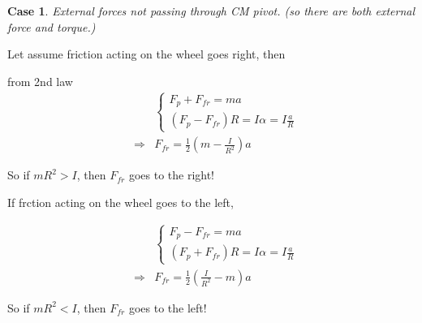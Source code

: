 \documentclass{article}
\newtheorem{case}[theorem]{Case}
\begin{document}
\newpage

\begin{case}
External forces not passing through CM pivot. (so there are both external
force and torque.)
\end{case}



\bigskip

\begin{multicols}{2}%

Let assume friction acting on the wheel goes right, then



from 2nd law%
\begin{eqnarray*}
&&\left\{ 
\begin{array}{c}
F_{p}+F_{fr}=ma \\ 
\left( F_{p}-F_{fr}\right) R=I\alpha =I\frac{a}{R}%
\end{array}%
\right. \\
&\Rightarrow &F_{fr}=\frac{1}{2}\left( m-\frac{I}{R^{2}}\right) a
\end{eqnarray*}

So if $mR^{2}>I$, then $F_{fr}$ goes to the right!

\bigskip

If frction acting on the wheel goes to the left,



\begin{eqnarray*}
&&\left\{ 
\begin{array}{c}
F_{p}-F_{fr}=ma \\ 
\left( F_{p}+F_{fr}\right) R=I\alpha =I\frac{a}{R}%
\end{array}%
\right. \\
&\Rightarrow &F_{fr}=\frac{1}{2}\left( \frac{I}{R^{2}}-m\right) a
\end{eqnarray*}

So if $mR^{2}<I$, then $F_{fr}$ goes to the left!

\bigskip

\end{multicols}%

\bigskip
\end{document}
